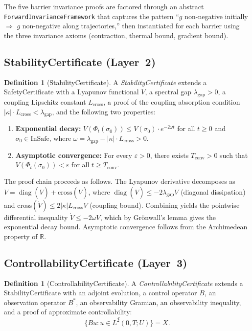\documentclass[11pt,a4paper]{article}
\theoremstyle{plain}
\theoremstyle{definition}
\newtheorem{definition}[theorem]{Definition}
\theoremstyle{remark}
\newcommand{\R}{\mathbb{R}}
\newcommand{\abs}[1]{\lvert #1 \rvert}
\newcommand{\InSafe}{\mathrm{InSafe}}
\newcommand{\kk}{\kappa}
\newcommand{\leaninline}[1]{\texttt{#1}}
\DeclareMathOperator{\diag}{diag}
\begin{document}
The five barrier invariance proofs are factored through an abstract
\leaninline{ForwardInvarianceFramework} that captures the pattern
``$g$ non-negative initially $\Rightarrow$ $g$ non-negative along
trajectories,'' then instantiated for each barrier using the three
invariance axioms (contraction, thermal bound, gradient bound).

\subsection{StabilityCertificate (Layer~2)}

\begin{definition}[StabilityCertificate]\label{def:stab-cert}
A \emph{StabilityCertificate} extends a SafetyCertificate with a
Lyapunov functional $V$, a spectral gap $\lambda_{\mathrm{gap}} > 0$,
a coupling Lipschitz constant $L_{\mathrm{cross}}$, a proof of the
coupling absorption condition $\abs{\kk} \cdot L_{\mathrm{cross}} <
\lambda_{\mathrm{gap}}$, and the following two properties:
\begin{enumerate}[label=(\alph*)]
  \item \textbf{Exponential decay:}
    $V(\Phi_t(\sigma_0)) \le V(\sigma_0) \cdot e^{-2\omega t}$
    for all $t \ge 0$ and $\sigma_0 \in \InSafe$, where
    $\omega = \lambda_{\mathrm{gap}} - \abs{\kk} \cdot L_{\mathrm{cross}} > 0$.
  \item \textbf{Asymptotic convergence:} For every $\varepsilon > 0$,
    there exists $T_{\mathrm{conv}} > 0$ such that
    $V(\Phi_t(\sigma_0)) < \varepsilon$ for all $t \ge T_{\mathrm{conv}}$.
\end{enumerate}
\end{definition}

The proof chain proceeds as follows.  The Lyapunov derivative decomposes
as $\dot{V} = \diag(\dot{V}) + \mathrm{cross}(\dot{V})$, where
$\diag(\dot{V}) \le -2\lambda_{\mathrm{gap}} V$ (diagonal dissipation)
and $\mathrm{cross}(\dot{V}) \le 2\abs{\kk} L_{\mathrm{cross}} V$
(coupling bound).  Combining yields the pointwise differential inequality
$\dot{V} \le -2\omega V$, which by Gr\"{o}nwall's lemma gives the
exponential decay bound.  Asymptotic convergence follows from
the Archimedean property of $\R$.

\subsection{ControllabilityCertificate (Layer~3)}

\begin{definition}[ControllabilityCertificate]\label{def:ctrl-cert}
A \emph{ControllabilityCertificate} extends a StabilityCertificate with
an adjoint evolution, a control operator $B$, an observation operator
$B^*$, an observability Gramian, an observability inequality, and a
proof of approximate controllability:
\[
  \overline{\{B u : u \in L^2(0,T; U)\}} = X.
\]
\end{definition}
\end{document}
